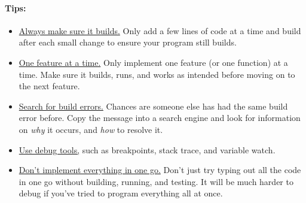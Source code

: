         \paragraph{Tips:}
            \begin{itemize}
                \item   \underline{Always make sure it builds.}
                        Only add a few lines of code at a time and build
                        after each small change to ensure your program still builds.
                        
                \item   \underline{One feature at a time.}
                        Only implement one feature (or one function) at a time.
                        Make sure it builds, runs, and works as intended before
                        moving on to the next feature.
                        
                \item   \underline{Search for build errors.}
                        Chances are someone else has had the same build error before.
                        Copy the message into a search engine and look for information
                        on \textit{why} it occurs, and \textit{how} to resolve it.

                \item   \underline{Use debug tools,} such as breakpoints,
                        stack trace, and variable watch.
                
                \item   \underline{Don't implement everything in one go.}
                        Don't just try typing out all the code in one go
                        without building, running, and testing. It will be
                        much harder to debug if you've tried to program everything all at once.
            \end{itemize}

        \tableofcontents

    \newpage
